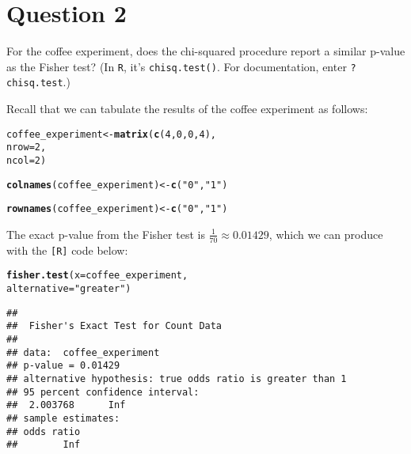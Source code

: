 \documentclass[11pt]{article}\usepackage[]{graphicx}\usepackage[]{color}
\makeatletter
\newcommand{\hlnum}[1]{\textcolor[rgb]{0.686,0.059,0.569}{#1}}%
\newcommand{\hlstr}[1]{\textcolor[rgb]{0.192,0.494,0.8}{#1}}%
\newcommand{\hlstd}[1]{\textcolor[rgb]{0.345,0.345,0.345}{#1}}%
\newcommand{\hlkwb}[1]{\textcolor[rgb]{0.69,0.353,0.396}{#1}}%
\newcommand{\hlkwc}[1]{\textcolor[rgb]{0.333,0.667,0.333}{#1}}%
\newcommand{\hlkwd}[1]{\textcolor[rgb]{0.737,0.353,0.396}{\textbf{#1}}}%
\newenvironment{kframe}{%
 \def\at@end@of@kframe{}%
 \ifinner\ifhmode%
  \def\at@end@of@kframe{\end{minipage}}%
  \begin{minipage}{\columnwidth}%
 \fi\fi%
 \def\FrameCommand##1{\hskip\@totalleftmargin \hskip-\fboxsep
 \colorbox{shadecolor}{##1}\hskip-\fboxsep
     \hskip-\linewidth \hskip-\@totalleftmargin \hskip\columnwidth}%
 \MakeFramed {\advance\hsize-\width
   \@totalleftmargin\z@ \linewidth\hsize
   \@setminipage}}%
 {\par\unskip\endMakeFramed%
 \at@end@of@kframe}
\newenvironment{knitrout}{}{} %
\theoremstyle{newstyle}
\makeatother
\begin{document}
\section{Question 2}

For the coffee experiment, does the chi-squared procedure report a similar p-value as the Fisher test? (In \texttt{R}, it's \texttt{chisq.test()}. For documentation, enter \texttt{?chisq.test}.)

Recall that we can tabulate the results of the coffee experiment as follows:

\begin{knitrout}
\color{fgcolor}\begin{kframe}
\begin{alltt}
\hlstd{coffee_experiment} \hlkwb{<-} \hlkwd{matrix}\hlstd{(}\hlkwd{c}\hlstd{(}\hlnum{4}\hlstd{,} \hlnum{0}\hlstd{,} \hlnum{0}\hlstd{,} \hlnum{4}\hlstd{),}
                            \hlkwc{nrow} \hlstd{=} \hlnum{2}\hlstd{,}
                            \hlkwc{ncol} \hlstd{=} \hlnum{2}\hlstd{)}

\hlkwd{colnames}\hlstd{(coffee_experiment)} \hlkwb{<-} \hlkwd{c}\hlstd{(}\hlstr{"0"}\hlstd{,} \hlstr{"1"}\hlstd{)}

\hlkwd{rownames}\hlstd{(coffee_experiment)} \hlkwb{<-} \hlkwd{c}\hlstd{(}\hlstr{"0"}\hlstd{,} \hlstr{"1"}\hlstd{)}
\end{alltt}
\end{kframe}
\end{knitrout}

The exact p-value from the Fisher test is $\frac{1}{70} \approx 0.01429$, which we can produce with the \texttt{[R]} code below:

\begin{knitrout}
\color{fgcolor}\begin{kframe}
\begin{alltt}
\hlkwd{fisher.test}\hlstd{(}\hlkwc{x} \hlstd{= coffee_experiment,}
            \hlkwc{alternative} \hlstd{=} \hlstr{"greater"}\hlstd{)}
\end{alltt}
\begin{verbatim}
## 
## 	Fisher's Exact Test for Count Data
## 
## data:  coffee_experiment
## p-value = 0.01429
## alternative hypothesis: true odds ratio is greater than 1
## 95 percent confidence interval:
##  2.003768      Inf
## sample estimates:
## odds ratio 
##        Inf
\end{verbatim}
\end{kframe}
\end{knitrout}
\end{document}
